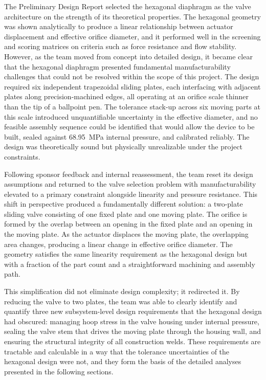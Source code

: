 \documentclass[12pt, letterpaper]{report}%
\newcounter{mycounter}           %
\newcounter{sub}[mycounter]      %
\newcommand{\specPressure}{68.95}%
\begin{document}
                The Preliminary Design Report selected the hexagonal diaphragm as the valve architecture 
                on the strength of its theoretical properties. The hexagonal geometry was shown analytically 
                to produce a linear relationship between actuator displacement and effective orifice diameter, 
                and it performed well in the screening and scoring matrices on criteria such as force 
                resistance and flow stability. However, as the team moved from concept into detailed design, 
                it became clear that the hexagonal diaphragm presented fundamental manufacturability 
                challenges that could not be resolved within the scope of this project. The design required 
                six independent trapezoidal sliding plates, each interfacing with adjacent plates along 
                precision-machined edges, all operating at an orifice scale thinner than the tip of a 
                ballpoint pen. The tolerance stack-up across six moving parts at this scale introduced 
                unquantifiable uncertainty in the effective diameter, and no feasible assembly sequence 
                could be identified that would allow the device to be built, sealed against \specPressure\ MPa 
                internal pressure, and calibrated reliably. The design was theoretically sound but 
                physically unrealizable under the project constraints.

                Following sponsor feedback and internal reassessment, the team reset its design assumptions 
                and returned to the valve selection problem with manufacturability elevated to a primary 
                constraint alongside linearity and pressure resistance. This shift in perspective produced 
                a fundamentally different solution: a two-plate sliding valve consisting of one fixed plate 
                and one moving plate. The orifice is formed by the overlap between an opening in the fixed 
                plate and an opening in the moving plate. As the actuator displaces the moving plate, the 
                overlapping area changes, producing a linear change in effective orifice diameter. The 
                geometry satisfies the same linearity requirement as the hexagonal design but with a 
                fraction of the part count and a straightforward machining and assembly path.

                This simplification did not eliminate design complexity; it redirected it. By reducing 
                the valve to two plates, the team was able to clearly identify and quantify three new 
                subsystem-level design requirements that the hexagonal design had obscured: managing hoop 
                stress in the valve housing under internal pressure, sealing the valve stem that drives the 
                moving plate through the housing wall, and ensuring the structural integrity of all 
                construction welds. These requirements are tractable and calculable in a way that the 
                tolerance uncertainties of the hexagonal design were not, and they form the basis of the 
                detailed analyses presented in the following sections.
\end{document}
